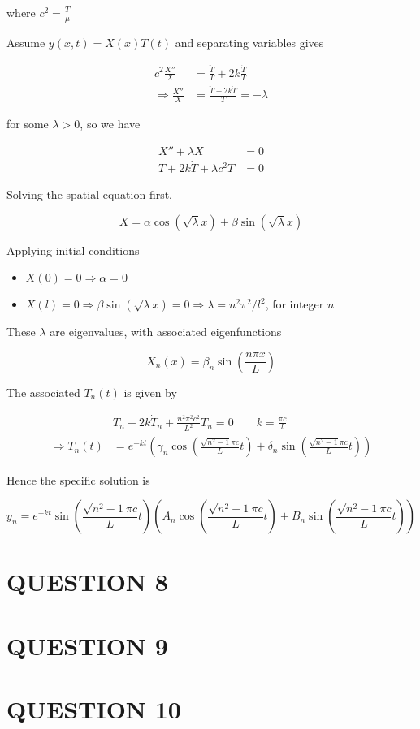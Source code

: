 \documentclass[a4paper]{article}
\begin{document}
\begin{enumerate}
\begin{itemize}
		where $ c^{2} = \frac{T}{\mu} $
		
	\end{itemize}
		
		Assume $ y(x,t) = X(x)T(t) $ and separating variables gives
		
		\begin{align*}
		c^{2} \frac{X''}{X} & = \frac{\ddot{T}}{T} + 2k \frac{\dot{T}}{T}    \\
		\Rightarrow  \frac{X''}{X} & = \frac{\ddot{T} + 2k \dot{T} }{T} = - \lambda 
		\end{align*}
		
		for some $ \lambda > 0 $, so we have
		
		\begin{align*}
		X'' + \lambda X& =0 \\
		\ddot{T}  + 2k \dot{T} + \lambda c^{2} T & = 0 
		\end{align*}
		
		Solving the spatial equation first,
		
		\[ X = \alpha \cos ( \sqrt{\lambda} x ) + \beta \sin ( \sqrt{\lambda} x ) \]
		
		Applying initial conditions
		
		\begin{itemize}
			\item $ X(0) = 0 \Rightarrow \alpha = 0$
			\item $ X(l) = 0 \Rightarrow \beta \sin ( \sqrt{\lambda} x ) = 0 \Rightarrow \lambda = n^{2} \pi^{2} / l^{2} $, for integer $ n $
		\end{itemize}
	
		These $ \lambda $ are eigenvalues, with associated eigenfunctions
		
		\[ X_{n}(x) = \beta_{n} \sin \left(  \frac{n \pi x}{L} \right)  \]
		
		The associated $ T_{n}(t) $ is given by
		
		\begin{align*}
		\qquad  & \ddot{T}_{n} + 2k \dot{T}_{n}  + \frac{n^{2} \pi^{2} c^{2} }{L^{2}}  T_{n} = 0 \qquad k = \frac{\pi c}{l}\\
		\Rightarrow T_{n}(t) & = e^{-kt} \left(    \gamma_{n} \cos \left(  \frac{\sqrt{n^{2} - 1} \pi c }{L} t \right) + \delta_{n} \sin \left(  \frac{\sqrt{n^{2} - 1} \pi c }{L} t \right)  \right)
		\end{align*}
		
		Hence the specific solution is 
		
		\[ y_{n}  = e^{-kt}\sin \left( \frac{\sqrt{n^{2} - 1} \pi c }{L} t \right)  \left(  A_{n} \cos  \left(  \frac{\sqrt{n^{2} - 1} \pi c }{L} t \right) + B_{n} \sin  \left(  \frac{\sqrt{n^{2} - 1} \pi c }{L} t \right) \right)    \]
		
		
\end{enumerate}
\section{QUESTION 8}
\section{QUESTION 9}
\section{QUESTION 10}
\end{document}
